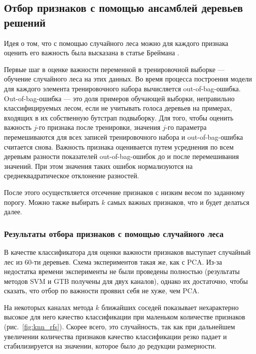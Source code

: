 \par
\subsection{Отбор признаков с помощью ансамблей деревьев решений}
Идея о том, что с помощью случайного леса можно для каждого признака оценить его важность была высказана в статье Бреймана \cite{breiman}.
\par
Первые шаг в оценке важности переменной в тренировочной выборке --- обучение случайного леса на этих данных. Во время процесса построения модели для каждого элемента тренировочного набора вычисляется out-of-bag-ошибка.
Out-of-bag-ошибка --- это доля примеров обучающей выборки, неправильно классифицируемых лесом, если не учитывать голоса деревьев на примерах, входящих в их собственную бутстрап подвыборку.
Для того, чтобы оценить важность \(j\)-го признака после тренировки, значения \(j\)-го параметра перемешиваются для всех записей тренировочного набора и out-of-bag-ошибка считается снова. Важность признака оценивается путем усреднения по всем деревьям разности показателей out-of-bag-ошибок до и после перемешивания значений. При этом значения таких ошибок нормализуются на среднеквадратическое отклонение разностей.
\par
После этого осуществляется отсечение признаков с низким весом по заданному порогу. Можно также выбирать \(k\) самых важных признаков, что и будет делаться далее.

\subsubsection*{Результаты отбора признаков с помощью случайного леса}
В качестве классификатора для оценки важности признаков выступает случайный лес из 60-ти деревьев. Схема экспериментов такая же, как с PCA. Из-за недостатка времени эксперименты не были проведены полностью (результаты методов SVM и GTB получены для двух каналов), однако их достаточно, чтобы сказать, что отбор по важности проявил себя не хуже, чем PCA.
\par
На некоторых каналах метода \(k\) ближайших соседей показывает нехарактерно высокое для него качество классификации при маленьком количестве признаков (рис.~\ref{fig:knn_rfs}). Скорее всего, это случайность, так как при дальнейшем увеличении количества признаков качество классификации резко падает и стабилизируется на значении, которое было до редукции размерности.

